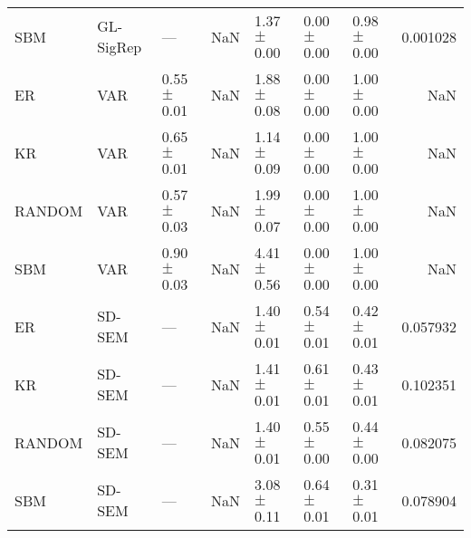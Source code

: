 \begin{tabular}{lllllllr}
SBM & GL-SigRep & --- & NaN & 1.37{\scriptsize$\pm$0.00} & 0.00{\scriptsize$\pm$0.00} & 0.98{\scriptsize$\pm$0.00} & 0.001028 \\
ER & VAR & 0.55{\scriptsize$\pm$0.01} & NaN & 1.88{\scriptsize$\pm$0.08} & 0.00{\scriptsize$\pm$0.00} & 1.00{\scriptsize$\pm$0.00} & NaN \\
KR & VAR & 0.65{\scriptsize$\pm$0.01} & NaN & 1.14{\scriptsize$\pm$0.09} & 0.00{\scriptsize$\pm$0.00} & 1.00{\scriptsize$\pm$0.00} & NaN \\
RANDOM & VAR & 0.57{\scriptsize$\pm$0.03} & NaN & 1.99{\scriptsize$\pm$0.07} & 0.00{\scriptsize$\pm$0.00} & 1.00{\scriptsize$\pm$0.00} & NaN \\
SBM & VAR & 0.90{\scriptsize$\pm$0.03} & NaN & 4.41{\scriptsize$\pm$0.56} & 0.00{\scriptsize$\pm$0.00} & 1.00{\scriptsize$\pm$0.00} & NaN \\
ER & SD-SEM & --- & NaN & 1.40{\scriptsize$\pm$0.01} & 0.54{\scriptsize$\pm$0.01} & 0.42{\scriptsize$\pm$0.01} & 0.057932 \\
KR & SD-SEM & --- & NaN & 1.41{\scriptsize$\pm$0.01} & 0.61{\scriptsize$\pm$0.01} & 0.43{\scriptsize$\pm$0.01} & 0.102351 \\
RANDOM & SD-SEM & --- & NaN & 1.40{\scriptsize$\pm$0.01} & 0.55{\scriptsize$\pm$0.00} & 0.44{\scriptsize$\pm$0.00} & 0.082075 \\
SBM & SD-SEM & --- & NaN & 3.08{\scriptsize$\pm$0.11} & 0.64{\scriptsize$\pm$0.01} & 0.31{\scriptsize$\pm$0.01} & 0.078904 \\
\bottomrule
\end{tabular}
